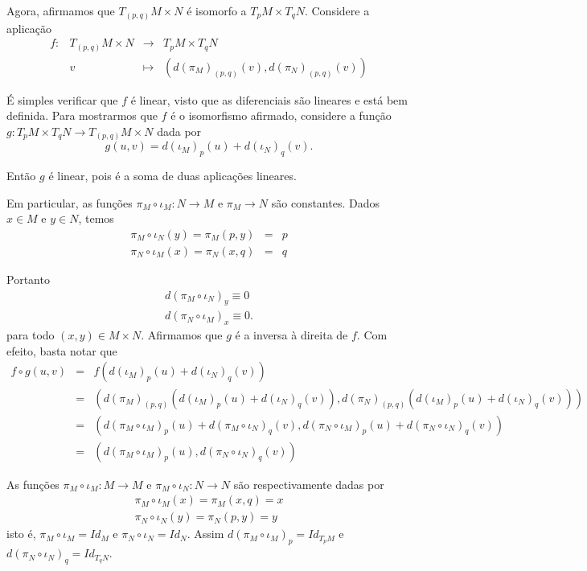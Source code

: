 \documentclass[twoside,openright,titlepage,numbers=noenddot,headinclude,  lineheaders footinclude=true,cleardoublepage=empty,BCOR=5mm,paper=a4,fontsize=12pt ]{scrbook}
\begin{document}
Agora, afirmamos que $T_{(p,q)}M \times N$ é isomorfo a $T_pM \times T_q N$. Considere a aplicação
\begin{equation*}
    \begin{array}{ccccc}
        f:& T_{(p,q)} M \times N &\longrightarrow &T_p M \times T_q N\\
        &v & \longmapsto &\left(d(\pi_M)_{(p,q)}(v),d(\pi_N)_{(p,q)}(v)\right)
    \end{array}
\end{equation*}

É simples verificar que $f$ é linear, visto que as diferenciais são lineares e está bem definida. Para mostrarmos que $f$ é o isomorfismo afirmado, considere a função $g:T_p M \times T_q N \longrightarrow T_{(p,q)}M \times N$ dada por 
\begin{equation*}
    g(u,v) = d(\iota_M)_p(u) + d(\iota_N)_q(v). 
\end{equation*}

Então $g$ é linear, pois é a soma de duas aplicações lineares.

Em particular, as funções $\pi_M \circ \iota_M: N \longrightarrow M$ e $\pi_M \longrightarrow N$ são constantes. Dados $x \in M$ e $y \in N$, temos 
 \begin{eqnarray*}
     \pi_M \circ \iota_N(y) = \pi_M(p,y) &=& p\\
     \pi_N \circ \iota_M(x) = \pi_N(x,q) &=& q
 \end{eqnarray*}
 
Portanto 
\begin{eqnarray*}
    d(\pi_M \circ \iota_N)_y \equiv 0\\
    d(\pi_N \circ \iota_M)_x \equiv 0.
\end{eqnarray*}
para todo $(x,y) \in M \times N$. Afirmamos que $g$ é a inversa à direita de $f$. Com efeito, basta notar que 
\begin{eqnarray*}
     f \circ g(u,v) &=& f(d(\iota_M)_p(u) + d(\iota_N)_q(v))\\
     &=&\left(d(\pi_M)_{(p, q)}(d(\iota_M)_p(u) + d(\iota_N)_q(v)),d(\pi_N)_{(p, q)}(d(\iota_M)_p(u) + d(\iota_N)_q(v))\right)\\
     &=&\left(d(\pi_M \circ \iota_M)_p(u) + d(\pi_M \circ \iota_N)_q(v),d(\pi_N \circ \iota_M)_p(u) + d(\pi_N \circ \iota_N)_q(v)\right)\\
     &=&\left(d(\pi_M \circ \iota_M)_p(u), d(\pi_N \circ \iota_N)_q(v)\right)
\end{eqnarray*}
 
As funções $\pi_M \circ \iota_M: M \longrightarrow M$ e $\pi_M \circ \iota_N: N \longrightarrow N$ são respectivamente dadas por 
\begin{eqnarray*}
    \pi_M \circ \iota_M(x) = \pi_M(x,q) = x\\
    \pi_N \circ \iota_N(y) = \pi_N(p,y) = y
\end{eqnarray*}
isto é, $\pi_M \circ \iota_M = Id_M$ e $\pi_N \circ \iota_N = Id_N$. Assim $d(\pi_M \circ \iota_M)_p = Id_{T_pM}$ e $d(\pi_N \circ \iota_N)_q = Id_{T_q N}$.
\end{document}
